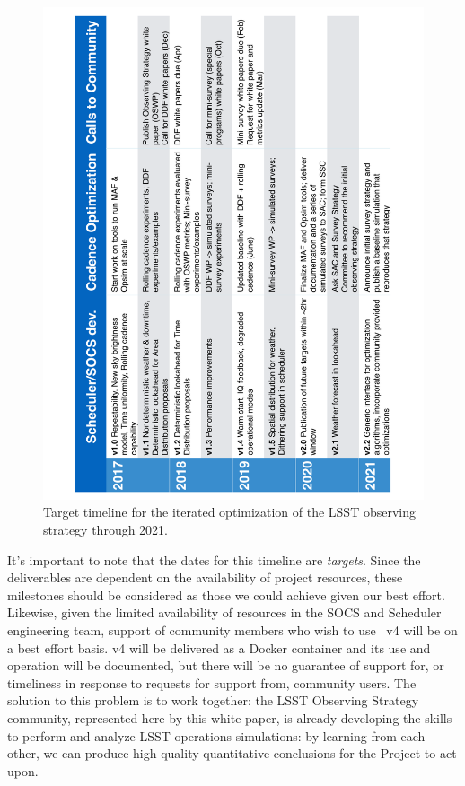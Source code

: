 \begin{figure}[t!]
\includegraphics[angle=270,width=0.99\linewidth,clip]{figs/opsim_timeline.pdf}
\vskip -0.4in
\caption{Target timeline for the iterated optimization of the LSST observing strategy through 2021.}
\label{fig:timeline}
\end{figure}

It's important to note that the dates for this timeline are {\it
targets}. Since the deliverables are dependent on the availability of
project resources, these milestones should be considered as those we
could achieve given our best effort. Likewise, given the limited
availability of resources in the SOCS and Scheduler engineering team,
support of community members who wish to use \OpSim~v4 will be on a best
effort basis. \OpSim v4 will be delivered as a Docker container and its
use and operation will be documented, but there will be no guarantee of
support for, or timeliness in response to requests for support from,
community users. The solution to this problem is to work together: the LSST Observing Strategy community, represented here by this white paper, is already developing the skills to perform and analyze LSST operations simulations: by learning from each other, we can produce high quality quantitative conclusions for the Project to act upon.



